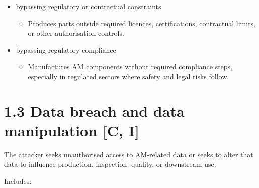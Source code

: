 \documentclass[10pt,a4paper,oneside]{report}
\begin{document}
\begin{itemize}
\begin{itemize}
\item Uses decentralised or localised AM production to avoid permitted manufacturing routes and make source tracing harder.
\end{itemize}
\item bypassing regulatory or contractual constraints
\begin{itemize}
\item Produces parts outside required licences, certifications, contractual limits, or other authorisation controls.
\end{itemize}
\item bypassing regulatory compliance
\begin{itemize}
\item Manufactures AM components without required compliance steps, especially in regulated sectors where safety and legal risks follow.
\end{itemize}
\end{itemize}


\section{1.3 Data breach and data manipulation [C, I]}


The attacker seeks unauthorised access to AM-related data or seeks to alter that data to influence production, inspection, quality, or downstream use.

Includes:
\end{document}
